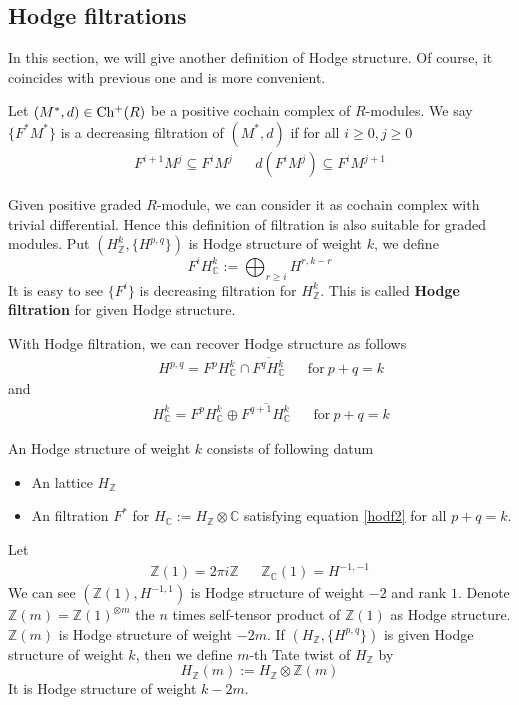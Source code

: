\documentclass[oneside,a4paper]{amsart}
\begin{document}
\subsection{Hodge filtrations}
In this section, we will give another definition of Hodge structure. Of course, it coincides with previous one and is more convenient.
\begin{secdefn}
	Let $(M^*,d) \in \operatorname*{Ch^{+}}(R)$ be a positive cochain complex of $R$-modules. We say $\{F^*M^*\}$ is a decreasing filtration of $(M^*,d)$ if for all $i \geq 0 , j \geq 0$
	\[
	\begin{aligned}
	F^{i+1}M^j \subseteq F^{i}M^j& & d(F^iM^j) \subseteq F^iM^{j+1}
	\end{aligned}
	\]
\end{secdefn}
Given positive graded $R$-module, we can consider it as cochain complex with trivial differential. Hence this definition of filtration is also suitable for graded modules. Put $(H_\mathbb{Z}^k, \{H^{p,q}\})$ is Hodge structure of weight $k$, we define
\begin{equation}
	F^iH_{\mathbb{C}}^k:= \bigoplus_{r \geq i}H^{r,k-r}
\end{equation}
It is easy to see $\{F^i\}$ is decreasing filtration for $H_{\mathbb{Z}}^k$. This is called \textbf{Hodge filtration} for given Hodge structure.

With Hodge filtration, we can recover Hodge structure as follows
\begin{align}
	\label{hodf1}
	& &H^{p,q}= F^{p}H_{\mathbb{C}}^k \cap \overline{F^q H_{\mathbb{C}}^k} && \text{for}\ p+q=k
\end{align}
and 
\begin{align}
	\label{hodf2}
	& &H_\mathbb{C}^k= F^p H^k_\mathbb{C} \oplus  \overline{F^{q+1}H^k_{\mathbb{C}}}& &\text{for}\ p+q=k
\end{align}

\begin{secdefn}
	An Hodge structure of weight $k$ consists of following datum
	\begin{itemize}
		\item An lattice $H_\mathbb{Z}$
		\item An filtration $F^*$ for $H_\mathbb{C}:= H_\mathbb{Z} \otimes \mathbb{C}$ satisfying equation \ref{hodf2} for all $p+q=k$.
	\end{itemize}
\end{secdefn}

\begin{ex}
	Let 
	\begin{align}
		\mathbb{Z}(1)= 2\pi i \mathbb{Z}& & \mathbb{Z}_{\mathbb{C}}(1)= H^{-1,-1}
	\end{align}
	We can see $(\mathbb{Z}(1), H^{-1,1})$ is Hodge structure of weight $-2$ and rank $1$. Denote $\mathbb{Z}(m)= \mathbb{Z}(1)^{\otimes m}$ the $n$   times self-tensor product of $\mathbb{Z}(1)$ as Hodge structure. $\mathbb{Z}(m)$ is Hodge structure of weight $-2m$. If $(H_\mathbb{Z}, \{ H^{p,q}\})$ is given Hodge structure of weight $k$, then we define $m$-th Tate twist of $H_\mathbb{Z}$ by
	\[
	H_\mathbb{Z}(m):= H_\mathbb{Z} \otimes \mathbb{Z}(m)
	\] 
	It is Hodge structure of weight $k-2m$. 
\end{ex}
\end{document}
